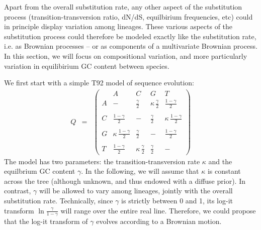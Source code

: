 \documentclass[usletter]{article}
\begin{document}
Apart from the overall substitution rate, any other aspect of the substitution process (transition-transversion ratio, dN/dS, equilbirium frequencies, etc) could in principle display variation among lineages. These various aspects of the substitution  process could therefore be modeled exactly like the substitution rate, i.e. as Brownian processes -- or as components of a multivariate Brownian process.
In this section, we will focus on compositional variation, and more particularly variation in equilibirium GC content between species.

We first start with a simple T92 model of sequence evolution:
\begin{eqnarray*}
Q &=& 
\left( \begin{array}{r|rrrrr}
&A&C&G&T\\
\hline
A&- &  \frac{\gamma}{2}  & \kappa \, \frac{\gamma}{2} &  \frac{1 - \gamma}{2} \\
\\
C& \frac{1 - \gamma}{2} & - & \frac{\gamma}{2} & \kappa \, \frac{1 - \gamma}{2}  \\
\\
G&\kappa \, \frac{1 - \gamma}{2}  &  \frac{\gamma}{2}  & - & \frac{1 - \gamma}{2}  \\
\\
T& \frac{1 - \gamma}{2} & \kappa \, \frac{\gamma}{2}  &  \frac{\gamma}{2}  & -
\end{array} \right)
\end{eqnarray*}
The model has two parameters: the transition-transversion rate $\kappa$ and the equilbrium GC content $\gamma$. In the following, we will assume that $\kappa$ is constant across the tree (although unknown, and thus endowed with a diffuse prior). In contrast, $\gamma$ will be allowed to vary among lineages, jointly with the overall substitution rate.
Technically, since $\gamma$ is strictly between 0 and 1, its log-it transform $\ln \frac{\gamma}{1 - \gamma}$ will range over the entire real line. Therefore, we could propose that the log-it transform of $\gamma$ evolves according to a Brownian motion.
\end{document}
